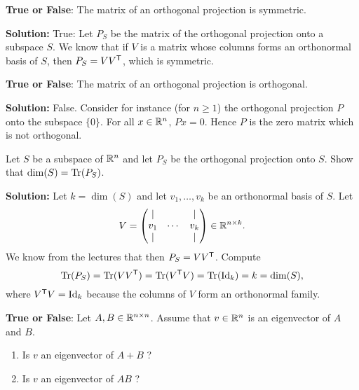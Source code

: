\documentclass[11pt,nocut]{article}
\begin{document}
\vspace{0.2cm}

\begin{problem}
	\textbf{True or False}: The matrix of an orthogonal projection is symmetric.
\end{problem}

\textbf{Solution:}
True: Let $P_S$ be the matrix of the orthogonal projection onto a subspace $S$.
We know that if $V$ is a matrix whose columns forms an orthonormal basis of $S$, then $P_S = VV^{{\sf T}}$, which is symmetric.
\vspace{0.2cm}

\begin{problem}
	\textbf{True or False}: The matrix of an orthogonal projection is orthogonal.
\end{problem}
\textbf{Solution:}
False. Consider for instance (for $n \geq 1$) the orthogonal projection $P$ onto the subspace $\{0\}$. For all $x \in \mathbb{R}^n$, $Px = 0$. Hence $P$ is the zero matrix which is not orthogonal.

\vspace{0.2cm}

\begin{problem}
	Let $S$ be a subspace of $\mathbb{R}^n$ and let $P_S$ be the orthogonal projection onto $S$. Show that ${{\rm dim}}(S) = {{\rm Tr}}(P_S)$.
\end{problem}

\textbf{Solution:}
Let $k = \dim(S)$ and let $v_1, \dots, v_k$ be an orthonormal basis of $S$. Let 
$$
V=
\begin{pmatrix}
	| & & | \\
	v_1 & \cdots & v_k \\
	| & & | 
\end{pmatrix}
\in \mathbb{R}^{n \times k}.
$$
We know from the lectures that then $P_S= VV^{{\sf T}}$. Compute
$$
{{\rm Tr}}(P_S) = {{\rm Tr}}(VV^{{\sf T}}) = {{\rm Tr}}(V^{{\sf T}} V) = {{\rm Tr}}({{\rm Id}}_k) = k = {{\rm dim}}(S),
$$
where $V^{{\sf T}} V = {{\rm Id}}_k$ because the columns of $V$ form an orthonormal family.


\vspace{0.2cm}

\begin{problem}
	\textbf{True or False}: Let $A,B \in \mathbb{R}^{n \times n}$. Assume that $v \in \mathbb{R}^n$ is an eigenvector of $A$ and $B$.
	\begin{enumerate}
		\item Is $v$ an eigenvector of $A+B$ ?
		\item Is $v$ an eigenvector of $AB$ ?
	\end{enumerate}
\end{problem}
\end{document}
